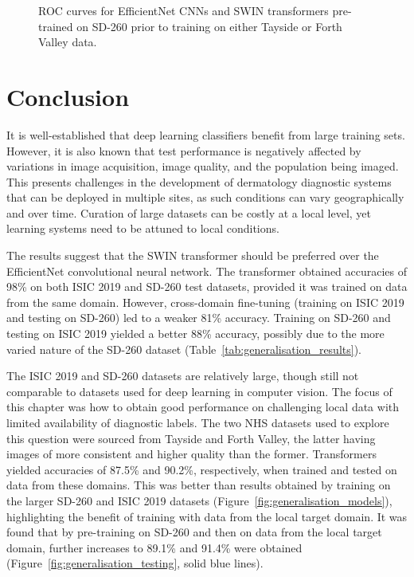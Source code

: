 \begin{figure}[!h]
\begin{tabular}{c}
	\end{tabular}
	\caption{ROC curves for EfficientNet CNNs and SWIN transformers pre-trained on SD-260 prior to training on either Tayside or Forth Valley data.}
	\label{fig:generalisation_roc}
\end{figure}



\section{Conclusion}
\label{sec:generalisation_conclusion}
It is well-established that deep learning classifiers benefit from large training sets. However, it is also known that test performance is negatively affected by variations in image acquisition, image quality, and the population being imaged. This presents challenges in the development of dermatology diagnostic systems that can be deployed in multiple sites, as such conditions can vary geographically and over time. Curation of large datasets can be costly at a local level, yet learning systems need to be attuned to local conditions.

The results suggest that the SWIN transformer should be preferred over the EfficientNet convolutional neural network. The transformer obtained accuracies of 98\% on both ISIC 2019 and SD-260 test datasets, provided it was trained on data from the same domain. However, cross-domain fine-tuning (training on ISIC 2019 and testing on SD-260) led to a weaker 81\% accuracy. Training on SD-260 and testing on ISIC 2019 yielded a better 88\% accuracy, possibly due to the more varied nature of the SD-260 dataset (Table~\ref{tab:generalisation_results}).

The ISIC 2019 and SD-260 datasets are relatively large, though still not comparable to datasets used for deep learning in computer vision. The focus of this chapter was how to obtain good performance on challenging local data with limited availability of diagnostic labels. The two NHS datasets used to explore this question were sourced from Tayside and Forth Valley, the latter having images of more consistent and higher quality than the former. Transformers yielded accuracies of 87.5\% and 90.2\%, respectively, when trained and tested on data from these domains. This was better than results obtained by training on the larger SD-260 and ISIC 2019 datasets (Figure~\ref{fig:generalisation_models}), highlighting the benefit of training with data from the local target domain. It was found that by pre-training on SD-260 and then on data from the local target domain, further increases to 89.1\% and 91.4\% were obtained (Figure~\ref{fig:generalisation_testing}, solid blue lines).

